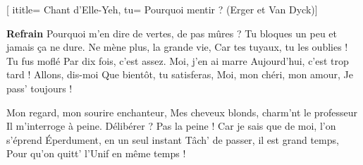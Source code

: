 [
ititle= {Chant d'Elle-Yeh},
tu= {Pourquoi mentir ? (Erger et Van Dyck)}]

\beginchorus
\textbf {Refrain}
Pourquoi m'en dire de vertes, de pas mûres ?
Tu bloques un peu et jamais ça ne dure.
Ne mène plus, la grande vie,
Car tes tuyaux, tu les oublies !
Tu fus moflé
Par dix fois, c'est assez.
Moi, j'en ai marre
Aujourd'hui, c'est trop tard !
Allons, dis-moi
Que bientôt, tu satisferas,
Moi, mon chéri, mon amour,
Je pass' toujours !
\endchorus

\beginverse
Mon regard, mon sourire enchanteur,
Mes cheveux blonds, charm'nt le professeur
Il m'interroge à peine.
Délibérer ? Pas la peine !
Car je sais que de moi, l'on s'éprend
Éperdument, en un seul instant
Tâch' de passer, il est grand temps,
Pour qu'on quitt' l'Unif en même temps !
\endverse

\endsong
